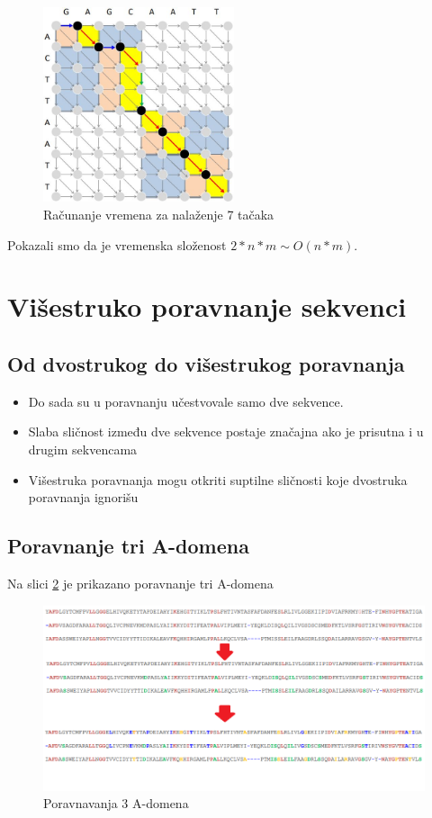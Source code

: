 \begin{figure}[h!]
\centering
\includegraphics[width=0.5\textwidth]{poglavlja/5/slike/vremenskaSlozenostPPV.JPG}
\caption{Računanje vremena za nalaženje 7 tačaka}
\label{slika:vreme}
\end{figure}

Pokazali smo da je vremenska složenost $2*n*m \sim O(n*m)$. \\

\section{Višestruko poravnanje sekvenci}

\subsection{Od dvostrukog do višestrukog poravnanja}
\begin{itemize}
    \item Do sada su u poravnanju učestvovale samo dve sekvence.
    \item Slaba sličnost između dve sekvence postaje značajna ako je prisutna i u drugim sekvencama
    \item Višestruka poravnanja mogu otkriti suptilne sličnosti koje dvostruka poravnanja ignorišu
\end{itemize}

\subsection{Poravnanje tri A-domena}
Na slici \ref{slika:poravnavanjaTriA} je prikazano poravnanje tri A-domena
\begin{figure}[h!]
\centering
\includegraphics[width=\textwidth]{poglavlja/5/slike/poravnavanjaTriAdomena.png}
\caption{Poravnavanja 3 A-domena}
\label{slika:poravnavanjaTriA}
\end{figure}

